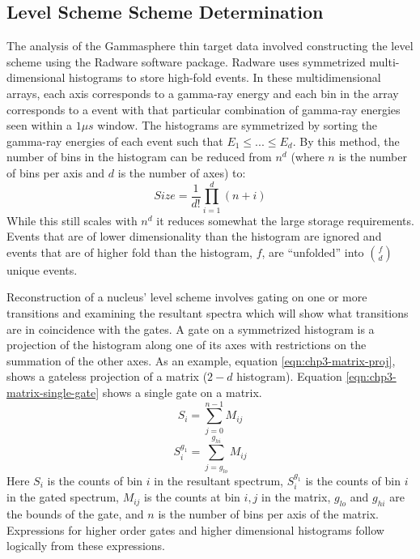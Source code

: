 \subsection{Level Scheme Scheme Determination}
\label{ssec:exp-pr-data-proc-lvl-scheme}
The analysis of the Gammasphere thin target data involved constructing the level scheme using the Radware software package\cite{radware}. Radware uses symmetrized multi-dimensional histograms to store high-fold events. In these multidimensional arrays, each axis corresponds to a gamma-ray energy and each bin in the array corresponds to a event with that particular combination of gamma-ray energies seen within a $1\mu{}s$ window. The histograms are symmetrized by sorting the gamma-ray energies of each event such that $E_1\leq{}...\leq{}E_d$. By this method, the number of bins in the histogram can be reduced from $n^d$ (where $n$ is the number of bins per axis and $d$ is the number of axes) to:
\begin{equation}
\label{eqn:chp3-hist-size}
Size=\frac{1}{d!}\prod\limits_{i=1}^{d}(n+i)
\end{equation}
While this still scales with $n^d$ it reduces somewhat the large storage requirements. Events that are of lower dimensionality than the histogram are ignored and events that are of higher fold than the histogram, $f$, are ``unfolded'' into $f \choose d$ unique events.

Reconstruction of a nucleus' level scheme involves gating on one or more transitions and examining the resultant spectra which will show what transitions are in coincidence with the gates. A gate on a symmetrized histogram is a projection of the histogram along one of its axes with restrictions on the summation of the other axes. As an example, equation \ref{eqn:chp3-matrix-proj}, shows a gateless projection of a matrix ($2-d$ histogram). Equation \ref{eqn:chp3-matrix-single-gate} shows a single gate on a matrix.
\begin{equation}
\label{eqn:chp3-matrix-proj}
S_i = \sum\limits_{j=0}^{n-1}M_{ij}
\end{equation}
\begin{equation}
\label{eqn:chp3-matrix-single-gate}
S^{g_1}_i = \sum\limits_{j=g_{lo}}^{g_{hi}}M_{ij}
\end{equation}
Here $S_i$ is the counts of bin $i$ in the resultant spectrum, $S^{g_1}_i$ is the counts of bin $i$ in the gated spectrum, $M_{ij}$ is the counts at bin $i,j$ in the matrix, $g_{lo}$ and $g_{hi}$ are the bounds of the gate, and $n$ is the number of bins per axis of the matrix. Expressions for higher order gates and higher dimensional histograms follow logically from these expressions.

